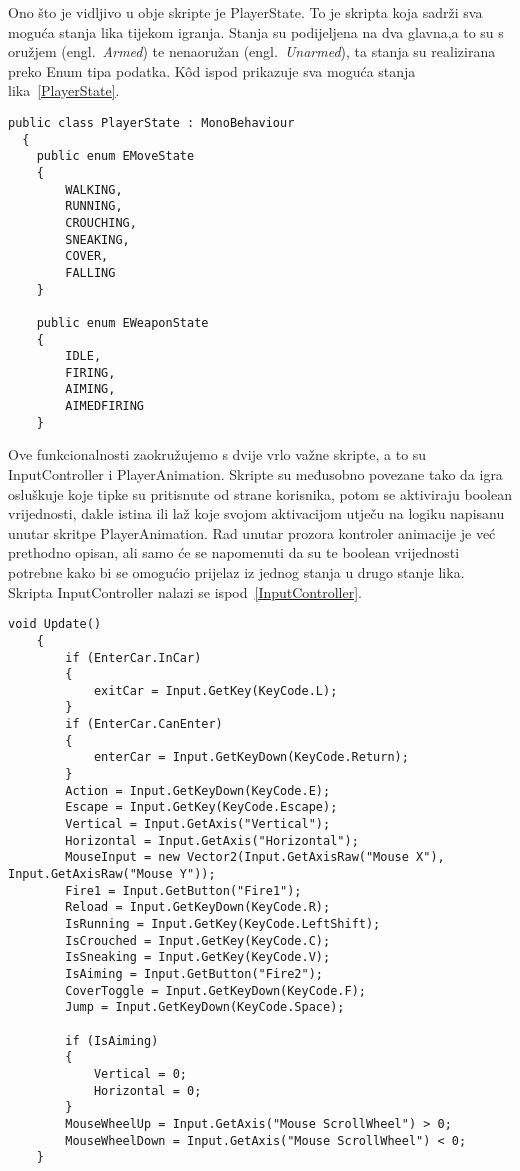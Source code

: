Ono što je vidljivo u obje skripte je PlayerState. To je skripta koja sadrži sva moguća stanja lika tijekom igranja. Stanja su podijeljena na dva glavna,a to su s oružjem (engl.~\textit{Armed}) te nenaoružan (engl.~\textit{Unarmed}), ta stanja su realizirana preko Enum tipa podatka. K\^od ispod prikazuje sva moguća stanja lika~\ref{PlayerState}.
\begin{lstlisting}[caption={Stanja lika}, label=PlayerState]
   public class PlayerState : MonoBehaviour
  {
    public enum EMoveState
    {
        WALKING,
        RUNNING,
        CROUCHING,
        SNEAKING,
        COVER,
        FALLING
    }

    public enum EWeaponState
    {
        IDLE,
        FIRING,
        AIMING,
        AIMEDFIRING
    }
\end{lstlisting}

Ove funkcionalnosti zaokružujemo s dvije vrlo važne skripte, a to su InputController i PlayerAnimation. Skripte su međusobno povezane tako da igra osluškuje koje tipke su pritisnute od strane korisnika, potom se aktiviraju boolean vrijednosti, dakle istina ili laž koje svojom aktivacijom utječu na logiku napisanu unutar skritpe PlayerAnimation. Rad unutar prozora kontroler animacije je već prethodno opisan, ali samo će se napomenuti da su te boolean vrijednosti potrebne kako bi se omogućio prijelaz iz jednog stanja u drugo stanje lika. Skripta InputController nalazi se ispod~\ref{InputController}.
\begin{lstlisting}[caption={Kontroler unosa korisnika}, label=InputController]
 void Update()
    {
        if (EnterCar.InCar)
        {
            exitCar = Input.GetKey(KeyCode.L);
        }
        if (EnterCar.CanEnter)
        {
            enterCar = Input.GetKeyDown(KeyCode.Return);
        }
        Action = Input.GetKeyDown(KeyCode.E);
        Escape = Input.GetKey(KeyCode.Escape);
        Vertical = Input.GetAxis("Vertical");
        Horizontal = Input.GetAxis("Horizontal");
        MouseInput = new Vector2(Input.GetAxisRaw("Mouse X"), Input.GetAxisRaw("Mouse Y"));
        Fire1 = Input.GetButton("Fire1");
        Reload = Input.GetKeyDown(KeyCode.R);
        IsRunning = Input.GetKey(KeyCode.LeftShift);
        IsCrouched = Input.GetKey(KeyCode.C);
        IsSneaking = Input.GetKey(KeyCode.V);
        IsAiming = Input.GetButton("Fire2");
        CoverToggle = Input.GetKeyDown(KeyCode.F);
        Jump = Input.GetKeyDown(KeyCode.Space);

        if (IsAiming)
        {
            Vertical = 0;
            Horizontal = 0;
        }
        MouseWheelUp = Input.GetAxis("Mouse ScrollWheel") > 0;
        MouseWheelDown = Input.GetAxis("Mouse ScrollWheel") < 0;
    }
\end{lstlisting}

